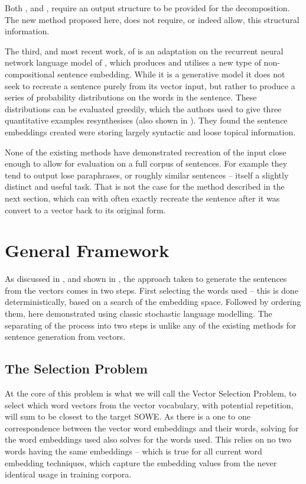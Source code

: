 \documentclass[11pt]{article}
\theoremstyle{plain}
\theoremstyle{definition}
\begin{document}
Both \textcite{Dinu2014CompositionalGeneration}, and  \textcite{iyyer2014generating}, require an output structure to be provided for the decomposition. The new method proposed here, does not require, or indeed allow, this structural information.

The third, and most recent work, of \textcite{Bowman2015SmoothGeneration} is an adaptation on the recurrent neural network language model of \textcite{mikolov2011RnnLM}, which produces and utilises a new type of non-compositional sentence embedding. While it is a generative model it does not seek to recreate a sentence purely from its vector input, but rather to produce a series of probability distributions on the words in the sentence. These distributions can be evaluated greedily, which the authors used to give three quantitative examples resynthesises (also shown in ). They found the sentence embeddings created were storing largely syntactic and loose topical information. 

None of the existing methods have demonstrated recreation of the input close enough to allow for evaluation on a full corpus of sentences. For example they tend to output lose paraphrases, or roughly similar sentences -- itself a slightly distinct and useful task. That is not the case for the method described in the next section, which can with often exactly recreate the sentence after it was convert to a vector back to its original form. 


\section{General Framework}\label{framework}
As discussed in , and shown in , the approach taken to generate the sentences from the vectors comes in two steps. First selecting the words used -- this is done deterministically, based on a search of the embedding space. Followed by ordering them, here demonstrated using classic stochastic language modelling. The separating of the process into two steps is unlike any of the existing methods for sentence generation from vectors.

\subsection{The Selection Problem}

At the core of this problem is what we will call the Vector Selection Problem, to select which word vectors from the vector vocabulary, with potential repetition, will sum to be closest to the target SOWE.
As there is a one to one correspondence between the vector word embeddings and their words, solving for the word embeddings used also solves for the words used. This relies on no two words having the same embeddings -- which is true for all current word embedding techniques, which capture the embedding values from the never identical usage in training corpora.
\end{document}
